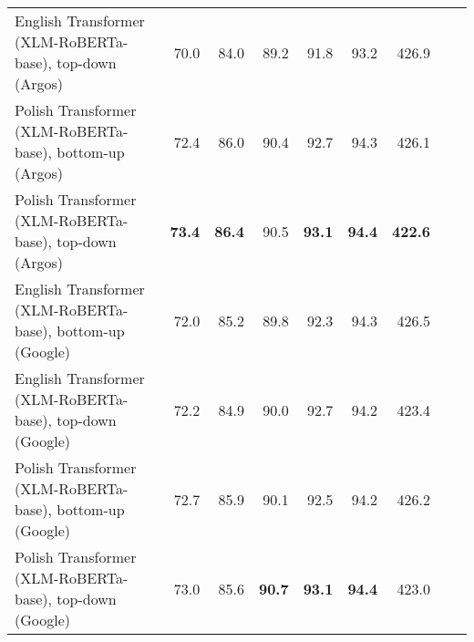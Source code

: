 \begin{table}[ht!]
{\begin{tabular}{lrrrrrrrr}
  English Transformer (XLM-RoBERTa-base), top-down (Argos) & 70.0 & 84.0 & 89.2 & 91.8 & 93.2 & 426.9 \\ 
  Polish Transformer (XLM-RoBERTa-base), bottom-up (Argos) & 72.4 & 86.0 & 90.4 & 92.7 & 94.3 & 426.1 \\ 
  Polish Transformer (XLM-RoBERTa-base), top-down (Argos) & \textbf{73.4} & \textbf{86.4} & 90.5 & \textbf{93.1} & \textbf{94.4} & \textbf{422.6} \\ 
  English Transformer (XLM-RoBERTa-base), bottom-up (Google) & 72.0 & 85.2 & 89.8 & 92.3 & 94.3 & 426.5 \\ 
  English Transformer (XLM-RoBERTa-base), top-down (Google) & 72.2 & 84.9 & 90.0 & 92.7 & 94.2 & 423.4 \\ 
  Polish Transformer (XLM-RoBERTa-base), bottom-up (Google) & 72.7 & 85.9 & 90.1 & 92.5 & 94.2 & 426.2 \\ 
  Polish Transformer (XLM-RoBERTa-base), top-down (Google) & 73.0 & 85.6 & \textbf{90.7} & \textbf{93.1} & \textbf{94.4} & 423.0 \\ 
   \hline
\end{tabular}
}
\end{table}




